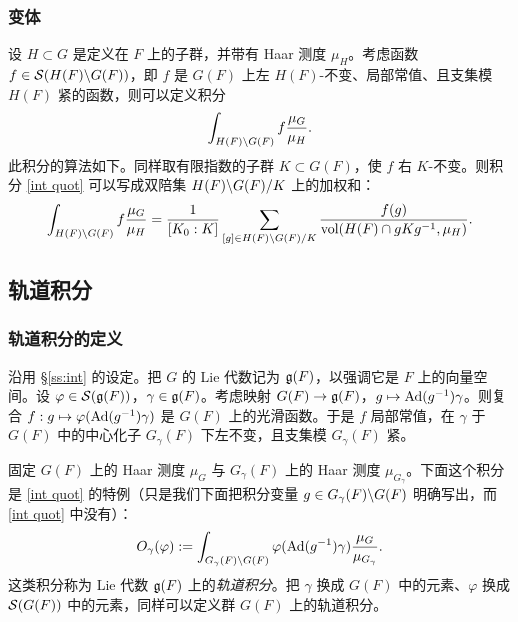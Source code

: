 \subsubsection{变体} 设 $H\subset G$ 是定义在 $F$ 上的子群，并带有 Haar 测度 $\mu_{H}$。考虑函数 $f\in\mathcal{S}(H(F)\backslash G(F))$，即 $f$ 是 $G(F)$ 上左 $H(F)$-不变、局部常值、且支集模 $H(F)$ 紧的函数，则可以定义积分
\begin{equation}\label{int quot}
\int_{H(F)\backslash G(F)}f\frac{\mu_{G}}{\mu_{H}}.
\end{equation}
此积分的算法如下。同样取有限指数的子群 $K\subset G(F)$，使 $f$ 右 $K$-不变。则积分 \eqref{int quot} 可以写成双陪集 $H(F)\backslash G(F)/K$ 上的加权和：
\begin{equation*}
\int_{H(F)\backslash G(F)}f\frac{\mu_{G}}{\mu_{H}}=\frac{1}{[K_{0}:K]}\sum_{[g]\in H(F)\backslash G(F)/K}\frac{f(g)}{\textup{vol}(H(F)\cap gKg^{-1}, \mu_{H})}.
\end{equation*}

\subsection{轨道积分}

\subsubsection{轨道积分的定义} 沿用 \S\ref{ss:int} 的设定。把 $G$ 的 Lie 代数记为 $\mathfrak{g}(F)$，以强调它是 $F$ 上的向量空间。设 $\varphi\in\mathcal{S}(\mathfrak{g}(F))$，$\gamma\in\mathfrak{g}(F)$。考虑映射 $G(F)\to \mathfrak{g}(F)$，$g\mapsto \textup{Ad}(g^{-1})\gamma$。则复合 $f: g\mapsto \varphi(\textup{Ad}(g^{-1})\gamma)$ 是 $G(F)$ 上的光滑函数。于是 $f$ 局部常值，在 $\gamma$ 于 $G(F)$ 中的中心化子 $G_{\gamma}(F)$ 下左不变，且支集模 $G_{\gamma}(F)$ 紧。

固定 $G(F)$ 上的 Haar 测度 $\mu_{G}$ 与 $G_{\gamma}(F)$ 上的 Haar 测度 $\mu_{G_{\gamma}}$。下面这个积分是 \eqref{int quot} 的特例（只是我们下面把积分变量 $g\in G_{\gamma}(F)\backslash G(F)$ 明确写出，而 \eqref{int quot} 中没有）：
\begin{equation*}
O_{\gamma}(\varphi):=\int_{G_{\gamma}(F)\backslash G(F)}\varphi(\textup{Ad}(g^{-1})\gamma)\frac{\mu_{G}}{\mu_{G_{\gamma}}}.
\end{equation*}
这类积分称为 Lie 代数 $\mathfrak{g}(F)$ 上的{\em 轨道积分}。把 $\gamma$ 换成 $G(F)$ 中的元素、$\varphi$ 换成 $\mathcal{S}(G(F))$ 中的元素，同样可以定义群 $G(F)$ 上的轨道积分。

